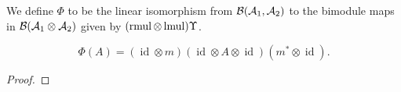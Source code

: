 
 \begin{definition}\label{PhiMap}
  \leanok
  We define $\Phi$ to be the linear isomorphism from $\mathcal{B}(\mathcal{A}_1,\mathcal{A}_2)$ to the bimodule maps in $\mathcal{B}(\mathcal{A}_1\otimes\mathcal{A}_2)$ given by $(\operatorname{rmul}\otimes\operatorname{lmul})\Upsilon$.
 \end{definition}

 \begin{lemma}\label{rmulMapLmul_apply_Upsilon_eq}
  \leanok
  \[\Phi(A)=(\operatorname{id}\otimes m)(\operatorname{id}\otimes A\otimes\operatorname{id})(m^*\otimes\operatorname{id}).\]
 \end{lemma}
 \begin{proof}
  
 \end{proof}

